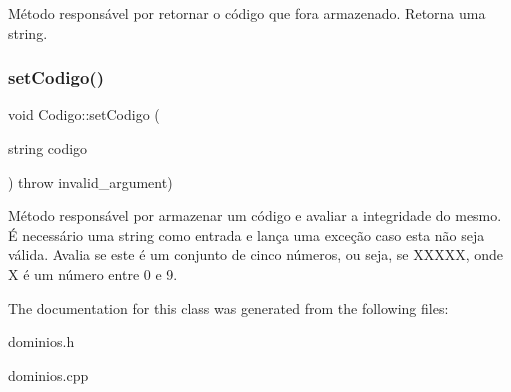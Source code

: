 Método responsável por retornar o código que fora armazenado. Retorna uma string. \mbox{\label{classCodigo_a863651a26dd7112dccced628aa96d86e}} 
\subsubsection{\texorpdfstring{set\+Codigo()}{setCodigo()}}
{\footnotesize\ttfamily void Codigo\+::set\+Codigo (\begin{DoxyParamCaption}\item[{string}]{codigo }\end{DoxyParamCaption}) throw  invalid\+\_\+argument) }

Método responsável por armazenar um código e avaliar a integridade do mesmo. É necessário uma string como entrada e lança uma exceção caso esta não seja válida. Avalia se este é um conjunto de cinco números, ou seja, se X\+X\+X\+XX, onde X é um número entre 0 e 9. 

The documentation for this class was generated from the following files\+:\begin{DoxyCompactItemize}
\item 
dominios.\+h\item 
dominios.\+cpp\end{DoxyCompactItemize}
